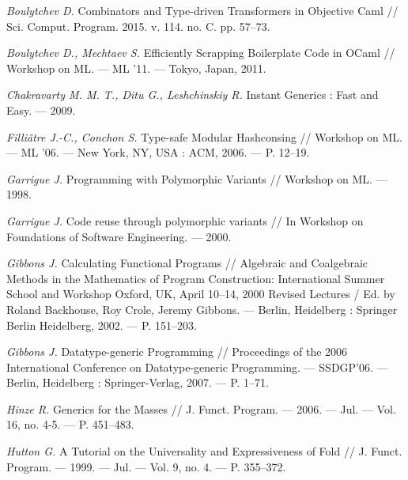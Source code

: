 \documentclass[a4paper,twoside,11pt]{article}
\numberwithin{equation}{section}
\begin{document}
\begin{thebibliography}{99}

\small

{\em Boulytchev D.} Combinators and Type-driven Transformers in
Objective Caml // Sci. Comput. Program. 2015.  v. 114. no. C. pp. 57–73.


{\em Boulytchev D., Mechtaev S.} Efficiently Scrapping Boilerplate
Code in OCaml // Workshop on ML. — ML ’11. — Tokyo, Japan, 2011.

{\em Chakravarty M. M. T., Ditu G., Leshchinskiy R.} In\-stant Generics : Fast and Easy. — 2009.

{\em Filli\^atre J.-C., Conchon S.} Type-safe Modular Hashconsing // Workshop on ML. — ML ’06. — New York, NY, USA : ACM, 2006. — P. 12–19.

{\em  Garrigue J.} Programming with Polymorphic Variants // Workshop on ML. — 1998.

{\em Garrigue J.} Code reuse through polymorphic variants // In
Workshop on Foundations of Software Engineering. — 2000.

{\em  Gibbons J.} Calculating Functional Programs // Algebraic and
Coalgebraic Methods in the Mathematics of Program Construction:
International Summer School and Workshop Oxford, UK, April 10–14, 2000 Revised Lectures / Ed. by Roland Backhouse, Roy Crole,
Jeremy Gibbons. — Berlin, Heidelberg : Springer Berlin Heidelberg,
2002. — P. 151–203. %

{\em Gibbons J.} Datatype-generic Programming // Proceedings
of the 2006 International Conference on Datatype-generic Program\-ming. — SSDGP’06. — Berlin, Heidelberg : Springer-Verlag, 2007. —
P. 1–71.%

{\em Hinze R.} Generics for the Masses // J. Funct. Program. — 2006. —
Jul. — Vol. 16, no. 4-5. — P. 451–483.

{\em Hutton G.} A Tutorial on the Universality and Expressive\-ness of Fold // J. Funct. Program. — 1999. — Jul. — Vol. 9,
no. 4. — P. 355–372. %


\end{thebibliography}
\end{document}

